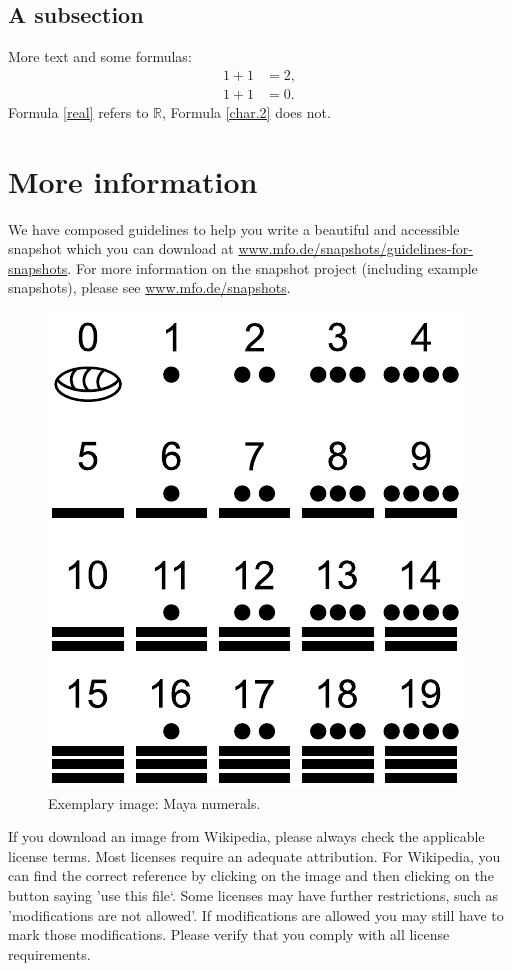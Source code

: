 \documentclass{snapshotmfo}
\begin{document}
\subsection{A subsection}
More text and some formulas:
\begin{align}\label{real}
1+1&=2,\\\label{char.2}
1+1&=0.
\end{align}
Formula \eqref{real} refers to $\mathbb{R}$, Formula \eqref{char.2} does not.

\section{More information}
We have composed guidelines to help you write a beautiful and accessible snapshot which you can download at \href{http://www.mfo.de/snapshots/guidelines-for-snapshots}{www.mfo.de/snapshots/guidelines-for-snapshots}. For more information on the snapshot project (including example snapshots), please see \href{http://www.mfo.de/snapshots}{www.mfo.de/snapshots}.


\begin{figure}[ht]
        \centering
        \includegraphics[width= 0.33 \textwidth]{maya.pdf}
        \caption{Exemplary image: Maya numerals.}
\label{fig:maya}
\end{figure}

If you download an image from Wikipedia, please always check the applicable license terms. Most licenses require an adequate attribution. For Wikipedia, you can find the correct reference by clicking on the image and then clicking on the button saying 'use this file‘. Some licenses may have further restrictions, such as 'modifications are not allowed'. If modifications are allowed you may still have to mark those modifications. Please verify that you comply with all license requirements.
\end{document}
